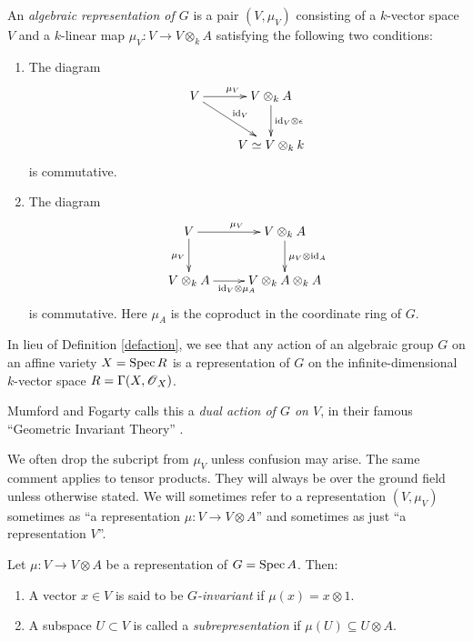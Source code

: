 \documentclass[11pt, english]{article}
\begin{document}
\begin{defi}
 An \emph{algebraic representation of $G$} is a pair $(V,\mu_V)$ consisting of a $k$-vector space $V$ and a $k$-linear map $\mu_V: V \to V \otimes_k A$ satisfying the following two conditions:
 \begin{enumerate}
 \item The diagram
\begin{equation}
\label{eq:algrep1}
\xymatrix{
V \ar[dr]^{\id_V} \ar[r]^{\mu_V} & V \otimes_k A \ar[d]^{\id_V \otimes \epsilon} \\
 & V \simeq V \otimes_k k
}
\end{equation}
is commutative.
\item The diagram
\[
\xymatrix{
V \ar[r]^{\mu_V} \ar[d]_{\mu_V} & V \otimes_k A \ar[d]^{\mu_V \otimes \id_A} \\
V \otimes_k A \ar[r]_{\id_V \otimes \mu_A} & V \otimes _k A \otimes_k A
}
\]
is commutative. Here $\mu_A$ is the coproduct in the coordinate ring of $G$.
 \end{enumerate}
\end{defi}

\begin{remark}
In lieu of Definition \ref{defaction}, we see that any action of an algebraic group $G$ on an affine variety $X=\operatorname{Spec} R$ is a representation of $G$ on the infinite-dimensional $k$-vector space $R=\Gamma(X,\operatorname{\mathscr{O}}_X)$.
\end{remark}

\begin{remark}
Mumford and Fogarty calls this a \emph{dual action of $G$ on $V$}, in their famous ``Geometric Invariant Theory'' \cite{mumford_git}.
\end{remark}

We often drop the subcript from $\mu_V$ unless confusion may arise. The same comment applies to tensor products. They will always be over the ground field unless otherwise stated. We will sometimes refer to a representation $(V,\mu_V)$ sometimes as ``a representation $\mu:V \to V \otimes A$'' and sometimes as just ``a representation $V$''.

\begin{defi}
Let $\mu:V \to V \otimes A$ be a representation of $G = \operatorname{Spec} A$. Then:
\begin{enumerate}
\item A vector $x \in V$ is said to be \emph{$G$-invariant} if $\mu(x) = x \otimes 1$.
\item A subspace $U \subset V$ is called a \emph{subrepresentation} if $\mu(U) \subseteq U \otimes A$.
\end{enumerate}
\end{defi}
\end{document}
